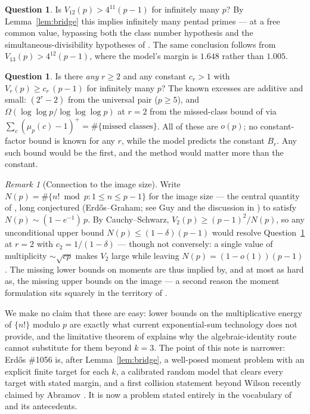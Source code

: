 \documentclass[11pt]{article}
\theoremstyle{definition}
\newtheorem{question}[theorem]{Question}
\theoremstyle{remark}
\newtheorem{remark}[theorem]{Remark}
\begin{document}
\begin{question}\label{q:pentads}
Is $V_{12}(p) > 4^{11}(p-1)$ for infinitely many $p$? By
Lemma~\ref{lem:bridge} this implies infinitely many pentad primes --- at a
free common value, bypassing both the class number hypothesis and the
simultaneous-divisibility hypotheses of \cite{Hino}. The same conclusion
follows from $V_{13}(p) > 4^{12}(p-1)$, where the model's margin is
$1.648$ rather than $1.005$.
\end{question}

\begin{question}\label{q:energy}
Is there \emph{any} $r \ge 2$ and any constant $c_r > 1$ with
$V_r(p) \ge c_r\,(p-1)$ for infinitely many $p$? The known excesses are
additive and small: $(2^r - 2)$ from the universal pair ($p \ge 5$), and
$\Omega(\log\log p/\log\log\log p)$ at $r = 2$ from the missed-class
bound of \cite{BLSS} via $\sum_c (\mu_p(c)-1)^+ = \#\{\text{missed
classes}\}$. All of these are $o(p)$; no constant-factor bound is known
for any $r$, while the model predicts the constant $B_r$. Any such bound
would be the first, and the method would matter more than the constant.
\end{question}

\begin{remark}[Connection to the image size]
Write $N(p) = \#\{ n! \bmod p : 1 \le n \le p-1 \}$ for the image size ---
the central quantity of \cite{KM}, long conjectured (Erd\H{o}s--Graham;
see Guy \cite{Gu04} and the discussion in \cite{KM}) to satisfy
$N(p) \sim (1 - e^{-1})\,p$. By Cauchy--Schwarz,
$V_2(p) \ge (p-1)^2 / N(p)$, so any unconditional upper bound
$N(p) \le (1-\delta)(p-1)$ would resolve Question~\ref{q:energy} at
$r = 2$ with $c_2 = 1/(1-\delta)$ --- though not conversely: a single
value of multiplicity $\sim \sqrt{cp}$ makes $V_2$ large while leaving
$N(p) = (1-o(1))(p-1)$. The missing lower bounds on moments are thus
implied by, and at most as hard as, the missing upper bounds on the
image --- a second reason the moment formulation sits squarely in the
territory of \cite{KM}.
\end{remark}

We make no claim that these are easy: lower bounds on the multiplicative
energy of $\{n!\}$ modulo $p$ are exactly what current exponential-sum
technology does not provide, and the limitative theorem of \cite{Hino}
explains why the algebraic-identity route cannot substitute for them
beyond $k=3$. The point of this note is narrower: Erd\H{o}s \#1056 is,
after Lemma~\ref{lem:bridge}, a well-posed moment problem with an explicit
finite target for each $k$, a calibrated random model that clears every
target with stated margin, and a first collision statement beyond Wilson
recently claimed by Abramov \cite{Ab26}. It is now a problem stated
entirely in the vocabulary of \cite{KM} and its antecedents.
\end{document}
